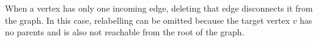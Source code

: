 When a vertex has only one incoming edge, deleting that edge disconnects it from the graph. 
In this case, relabelling can be omitted because the target vertex $v$ has no parents and is also not reachable from the root of the graph. 








